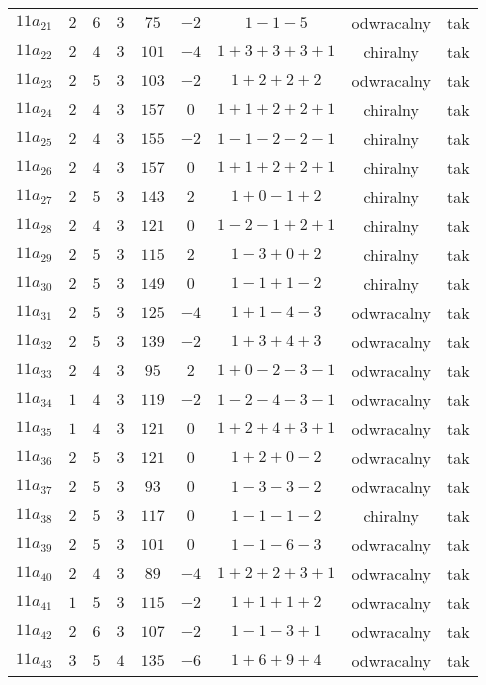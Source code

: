 \begin{longtable}{ccccccccc}
$11a_{21}$ & $2$ & $6$ & $3$ & $75$ & $-2$ & $1-1-5$ & odwracalny & tak \\
$11a_{22}$ & $2$ & $4$ & $3$ & $101$ & $-4$ & $1+3+3+3+1$ & chiralny & tak \\
$11a_{23}$ & $2$ & $5$ & $3$ & $103$ & $-2$ & $1+2+2+2$ & odwracalny & tak \\
$11a_{24}$ & $2$ & $4$ & $3$ & $157$ & $0$ & $1+1+2+2+1$ & chiralny & tak \\
$11a_{25}$ & $2$ & $4$ & $3$ & $155$ & $-2$ & $1-1-2-2-1$ & chiralny & tak \\
$11a_{26}$ & $2$ & $4$ & $3$ & $157$ & $0$ & $1+1+2+2+1$ & chiralny & tak \\
$11a_{27}$ & $2$ & $5$ & $3$ & $143$ & $2$ & $1+0-1+2$ & chiralny & tak \\
$11a_{28}$ & $2$ & $4$ & $3$ & $121$ & $0$ & $1-2-1+2+1$ & chiralny & tak \\
$11a_{29}$ & $2$ & $5$ & $3$ & $115$ & $2$ & $1-3+0+2$ & chiralny & tak \\
$11a_{30}$ & $2$ & $5$ & $3$ & $149$ & $0$ & $1-1+1-2$ & chiralny & tak \\
$11a_{31}$ & $2$ & $5$ & $3$ & $125$ & $-4$ & $1+1-4-3$ & odwracalny & tak \\
$11a_{32}$ & $2$ & $5$ & $3$ & $139$ & $-2$ & $1+3+4+3$ & odwracalny & tak \\
$11a_{33}$ & $2$ & $4$ & $3$ & $95$ & $2$ & $1+0-2-3-1$ & odwracalny & tak \\
$11a_{34}$ & $1$ & $4$ & $3$ & $119$ & $-2$ & $1-2-4-3-1$ & odwracalny & tak \\
$11a_{35}$ & $1$ & $4$ & $3$ & $121$ & $0$ & $1+2+4+3+1$ & odwracalny & tak \\
$11a_{36}$ & $2$ & $5$ & $3$ & $121$ & $0$ & $1+2+0-2$ & odwracalny & tak \\
$11a_{37}$ & $2$ & $5$ & $3$ & $93$ & $0$ & $1-3-3-2$ & odwracalny & tak \\
$11a_{38}$ & $2$ & $5$ & $3$ & $117$ & $0$ & $1-1-1-2$ & chiralny & tak \\
$11a_{39}$ & $2$ & $5$ & $3$ & $101$ & $0$ & $1-1-6-3$ & odwracalny & tak \\
$11a_{40}$ & $2$ & $4$ & $3$ & $89$ & $-4$ & $1+2+2+3+1$ & odwracalny & tak \\
$11a_{41}$ & $1$ & $5$ & $3$ & $115$ & $-2$ & $1+1+1+2$ & odwracalny & tak \\
$11a_{42}$ & $2$ & $6$ & $3$ & $107$ & $-2$ & $1-1-3+1$ & odwracalny & tak \\
$11a_{43}$ & $3$ & $5$ & $4$ & $135$ & $-6$ & $1+6+9+4$ & odwracalny & tak \\

\end{longtable}
